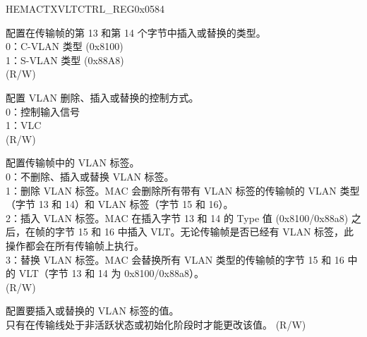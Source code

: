 \begin{register}{H}{EMACTXVLTCTRL\_REG}{0x0584}\label{regdesc:EMACTXVLANTAGCONTROLREG}
%
%
%
%
%
\regnewline%
\begin{regdesc}\begin{reglist}
\item [CSVL] 配置在传输帧的第 13 和第 14 个字节中插入或替换的类型。\\
0：C-VLAN 类型 (0x8100)\\
1：S-VLAN 类型 (0x88A8)\\(R/W)
\item [VLP] 配置 VLAN 删除、插入或替换的控制方式。\\
0：控制输入信号\\
1：VLC\\(R/W)
\item [VLC] 配置传输帧中的 VLAN 标签。\\
0：不删除、插入或替换 VLAN 标签。\\
1：删除 VLAN 标签。MAC 会删除所有带有 VLAN 标签的传输帧的 VLAN 类型（字节 13 和 14）和 VLAN 标签（字节 15 和 16）。\\
2：插入 VLAN 标签。MAC 在插入字节 13 和 14 的 Type 值 (0x8100/0x88a8) 之后，在帧的字节 15 和 16 中插入 VLT。无论传输帧是否已经有 VLAN 标签，此操作都会在所有传输帧上执行。\\
3：替换 VLAN 标签。MAC 会替换所有 VLAN 类型的传输帧的字节 15 和 16 中的 VLT（字节 13 和 14 为 0x8100/0x88a8）。\\(R/W)
\item [VLT] 配置要插入或替换的 VLAN 标签的值。\\
只有在传输线处于非活跃状态或初始化阶段时才能更改该值。 (R/W)
\end{reglist}\end{regdesc}
\end{register}


